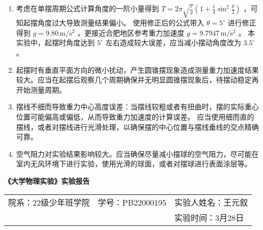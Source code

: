 \documentclass[UTF8]{article}
\begin{document}
{\begin{enumerate}[itemindent=1.3em,parsep=5pt,label=\arabic*.]
        \item 考虑在单摆周期公式计算角度的一阶小量得到 $T=2 \pi \sqrt{\frac{l}{g}}\left(1+\frac{1}{4} \sin ^2 \frac{\theta}{2}\right)$ ，可知起摆角度过大导致测量结果偏小。
        使用修正后的公式带入 $\theta = 5^\circ$ 进行修正得到 $g = 9.80\,\mathrm{m/s^2}$ ，更接近合肥地区参考重力加速度 $g = 9.7947\,\mathrm{m/s^2}$ 。
        本实验中，起摆时角度达到 $5^{\circ}$ 左右造成较大误差，应当减小摆动角度改为 $3.5^{\circ}$ 。
        
        \item 起摆时有垂直平面方向的微小扰动，产生圆锥摆现象造成测量重力加速度结果较大。应当在起摆后观察几个周期确保并无明显圆锥摆现象后，待摆动稳定再开始测量周期。
        
        \item 摆线不细而导致重力中心高度误差：当摆线较粗或者有扭曲时，摆的实际重心位置可能偏高或偏低，从而导致重力加速度的计算误差。
        应当使用细而直的摆线，或者对摆线进行光滑处理，以确保摆的中心位置与摆线垂线的交点精确可靠。
        
        \item 空气阻力对实验结果影响较大。应当确保尽量减小摆球的空气阻力，尽可能在室内无风环境下进行实验，使用光滑的球面，或者对摆球进行表面涂层等。
        
    \end{enumerate}

}

\newpage


\thispagestyle{empty}

    \begin{center}
    \bf\LARGE{《大学物理实验》实验报告}
    \end{center}
     
    \begin{center}
        \centering
        \begin{tabularx}{\textwidth}{XZY}
            {院系：22级少年班学院}&{学号：PB22000195}&{实验人姓名：王元叙}\\
            {}&{}&{实验时间：3月28日}\\
        \hline      
        \end{tabularx}
    \end{center}
    

\end{document}
